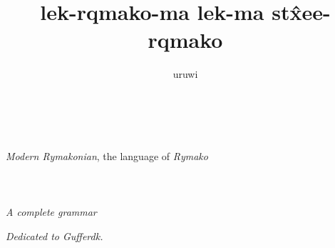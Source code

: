 \documentclass{book}
\title{lek-\bs{}rqmako-ma lek-ma st\^xee-\bs{}rqmako}
\author{uruwi}
\newcommand{\lname}{Modern Rymakonian}
\begin{document}
\pagecolor{Thistle!25}

\begin{titlepage}
    \makeatletter
    \begin{center}
        {\color{Orchid} \hprule \vspace{1.5ex} \\}
        {\Huge \dxvi \textcolor{Purple}{\@title} \\}
        {\large \textit{\lname}, the language of \textit{Rymako} \\}
        {\color{Orchid} \hprule \vspace{1.5ex} \\}
        \vspace{1.5cm}
        {\Large\bfseries \@author}\\[5pt]
        \vspace{2cm}
         \\[5pt]
        \emph{A complete grammar}\\[2cm]
        \vfill
        \vfill
        {\@date}
    \end{center}
    \makeatother
\end{titlepage}

\pagecolor{Thistle!15}

\begin{center}
    \textit{Dedicated to Gufferdk.}
\end{center}
\end{document}
